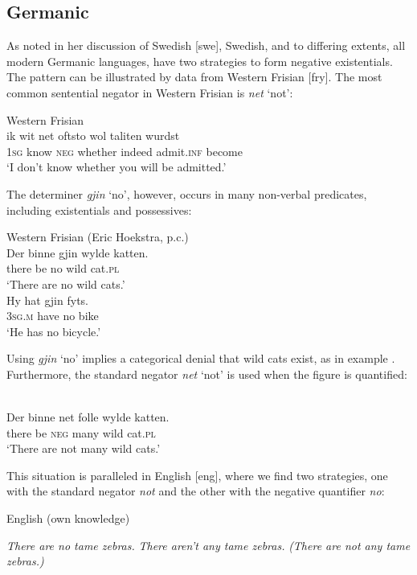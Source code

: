 \documentclass[output=paper,colorlinks,citecolor=brown]{langscibook}
\begin{document}
\subsection{Germanic}\label{sec:ieur-4.5}


As \citet[114--115]{Veselinova2013} noted in her discussion of
Swedish [swe], Swedish, and to differing extents, all modern
Germanic languages, have two strategies to form negative
existentials. The pattern can be illustrated by data from Western
Frisian [fry]. The most common sentential negator in Western Frisian is \textit{net} `not':
%
\begin{exe}\ex
Western Frisian \citep[91]{Tiersma1999}\\
    \gll ik    wit     net   oftsto     wol      taliten      wurdst \\
\textsc{1sg} know \textsc{neg} whether indeed admit.\textsc{inf} become\\
    \glt `I don't know whether you will be admitted.' 
    \end{exe}
%
The determiner \textit{gjin} `no', however, occurs in many non-verbal predicates, including existentials and possessives:
%
\begin{exe}\ex\label{ex:ieur-frisian-nowildcatsnow}
Western Frisian (Eric Hoekstra, p.c.)\\
    \gll Der   binne gjin wylde katten. \\
there be       no   wild   cat.\textsc{pl} \\
    \glt `There are no wild cats.' 
\ex
{}\\
    \gll Hy hat   gjin fyts. \\
  \textsc{3sg.m} have no   bike \\
    \glt `He has no bicycle.'
    \end{exe} 
%
Using \textit{gjin} `no' implies a categorical denial that wild cats exist, as in example . Furthermore, the standard negator \textit{net} `not' is used when the figure is quantified:
%
\begin{exe}\ex
{}\\
    \gll Der   binne  net   folle  wylde katten. \\
there be       \textsc{neg} many wild   cat.\textsc{pl} \\
    \glt `There are not many wild cats.' 
    \end{exe}
%
This situation is paralleled in English [eng], where we find two strategies, one with the standard negator \textit{not} and the other with the negative quantifier \textit{no}:
%
\begin{exe}\ex English (own knowledge)\begin{xlist}
        \ex\label{ex:ieur-english-no-tame-zebras}
     \textit{There are no tame zebras.}
\ex \textit{There aren’t any tame zebras.} \textit{(There are not any tame zebras.)}
    \end{xlist}\end{exe}
\end{document}
